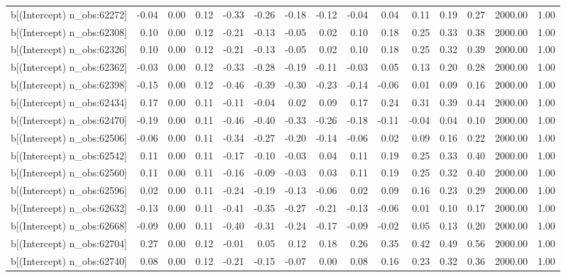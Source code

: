 \begin{table}[ht]
\begin{tabular}{rrrrrrrrrrrrrrr}
  b[(Intercept) n\_obs:62272] & -0.04 & 0.00 & 0.12 & -0.33 & -0.26 & -0.18 & -0.12 & -0.04 & 0.04 & 0.11 & 0.19 & 0.27 & 2000.00 & 1.00 \\ 
  b[(Intercept) n\_obs:62308] & 0.10 & 0.00 & 0.12 & -0.21 & -0.13 & -0.05 & 0.02 & 0.10 & 0.18 & 0.25 & 0.33 & 0.38 & 2000.00 & 1.00 \\ 
  b[(Intercept) n\_obs:62326] & 0.10 & 0.00 & 0.12 & -0.21 & -0.13 & -0.05 & 0.02 & 0.10 & 0.18 & 0.25 & 0.32 & 0.39 & 2000.00 & 1.00 \\ 
  b[(Intercept) n\_obs:62362] & -0.03 & 0.00 & 0.12 & -0.33 & -0.28 & -0.19 & -0.11 & -0.03 & 0.05 & 0.13 & 0.20 & 0.28 & 2000.00 & 1.00 \\ 
  b[(Intercept) n\_obs:62398] & -0.15 & 0.00 & 0.12 & -0.46 & -0.39 & -0.30 & -0.23 & -0.14 & -0.06 & 0.01 & 0.09 & 0.16 & 2000.00 & 1.00 \\ 
  b[(Intercept) n\_obs:62434] & 0.17 & 0.00 & 0.11 & -0.11 & -0.04 & 0.02 & 0.09 & 0.17 & 0.24 & 0.31 & 0.39 & 0.44 & 2000.00 & 1.00 \\ 
  b[(Intercept) n\_obs:62470] & -0.19 & 0.00 & 0.11 & -0.46 & -0.40 & -0.33 & -0.26 & -0.18 & -0.11 & -0.04 & 0.04 & 0.10 & 2000.00 & 1.00 \\ 
  b[(Intercept) n\_obs:62506] & -0.06 & 0.00 & 0.11 & -0.34 & -0.27 & -0.20 & -0.14 & -0.06 & 0.02 & 0.09 & 0.16 & 0.22 & 2000.00 & 1.00 \\ 
  b[(Intercept) n\_obs:62542] & 0.11 & 0.00 & 0.11 & -0.17 & -0.10 & -0.03 & 0.04 & 0.11 & 0.19 & 0.25 & 0.33 & 0.40 & 2000.00 & 1.00 \\ 
  b[(Intercept) n\_obs:62560] & 0.11 & 0.00 & 0.11 & -0.16 & -0.09 & -0.03 & 0.03 & 0.11 & 0.19 & 0.25 & 0.32 & 0.40 & 2000.00 & 1.00 \\ 
  b[(Intercept) n\_obs:62596] & 0.02 & 0.00 & 0.11 & -0.24 & -0.19 & -0.13 & -0.06 & 0.02 & 0.09 & 0.16 & 0.23 & 0.29 & 2000.00 & 1.00 \\ 
  b[(Intercept) n\_obs:62632] & -0.13 & 0.00 & 0.11 & -0.41 & -0.35 & -0.27 & -0.21 & -0.13 & -0.06 & 0.01 & 0.10 & 0.17 & 2000.00 & 1.00 \\ 
  b[(Intercept) n\_obs:62668] & -0.09 & 0.00 & 0.11 & -0.40 & -0.31 & -0.24 & -0.17 & -0.09 & -0.02 & 0.05 & 0.13 & 0.20 & 2000.00 & 1.00 \\ 
  b[(Intercept) n\_obs:62704] & 0.27 & 0.00 & 0.12 & -0.01 & 0.05 & 0.12 & 0.18 & 0.26 & 0.35 & 0.42 & 0.49 & 0.56 & 2000.00 & 1.00 \\ 
  b[(Intercept) n\_obs:62740] & 0.08 & 0.00 & 0.12 & -0.21 & -0.15 & -0.07 & 0.00 & 0.08 & 0.16 & 0.23 & 0.32 & 0.36 & 2000.00 & 1.00 \\ 

\end{tabular}
\end{table}
